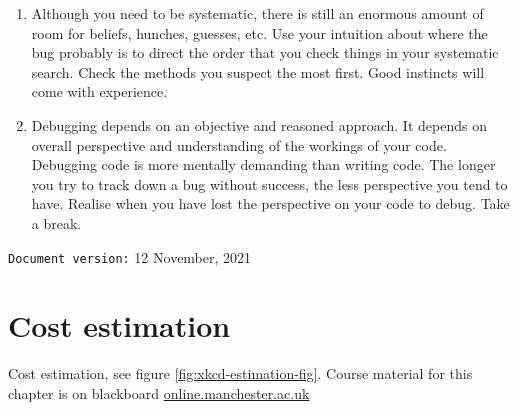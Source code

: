 \documentclass[
]{book}
\begin{document}
\begin{enumerate}
\item
  Although you need to be systematic, there is still an enormous amount of room for beliefs, hunches, guesses, etc. Use your intuition about where the bug probably is to direct the order that you check things in your systematic search. Check the methods you suspect the most first. Good instincts will come with experience.
\item
  Debugging depends on an objective and reasoned approach. It depends on overall perspective and understanding of the workings of your code. Debugging code is more mentally demanding than writing code. The longer you try to track down a bug without success, the less perspective you tend to have. Realise when you have lost the perspective on your code to debug. Take a break.
\end{enumerate}

\texttt{Document\ version:} 12 November, 2021

\hypertarget{estimating}{%
\chapter{Cost estimation}\label{estimating}}

Cost estimation, see figure \ref{fig:xkcd-estimation-fig}. Course material for this chapter is on blackboard \href{https://online.manchester.ac.uk}{online.manchester.ac.uk}
\end{document}
